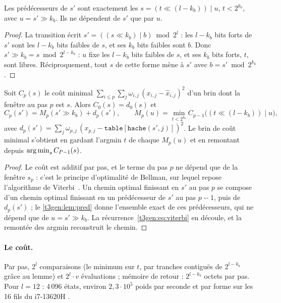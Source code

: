 \begin{lemme}\label{t3gen:lem:pred}
Les prédécesseurs de $s'$ sont exactement les $s = (t \ll (l - k_b)) \mid u$, $t < 2^{k_b}$, avec $u = s' \gg k_b$. Ils ne dépendent de $s'$ que par $u$.
\end{lemme}

\begin{proof}
La transition écrit $s' = ((s \ll k_b) \mid b) \bmod 2^l$ : les $l - k_b$ bits forts de $s'$ sont les $l - k_b$ bits faibles de $s$, et ses $k_b$ bits faibles sont $b$. Donc $s' \gg k_b = s \bmod 2^{l - k_b}$ : $u$ fixe les $l - k_b$ bits faibles de $s$, et ses $k_b$ bits forts, $t$, sont libres. Réciproquement, tout $s$ de cette forme mène à $s'$ avec $b = s' \bmod 2^{k_b}$.
\end{proof}

\begin{proposition}\label{t3gen:prop:viterbi}
Soit $C_p(s)$ le coût minimal $\sum_{i \le p}\sum_j \omega_{i,j}\,(x_{i,j} - \hat x_{i,j})^2$ d'un brin dont la fenêtre au pas $p$ est $s$. Alors $C_0(s) = d_0(s)$ et
\begin{equation}\label{t3gen:eq:viterbi}
C_p(s') = M_p(s' \gg k_b) + d_p(s'), \qquad M_p(u) = \min_{t < 2^{k_b}} C_{p-1}\bigl((t \ll (l - k_b)) \mid u\bigr),
\end{equation}
avec $d_p(s') = \sum_j \omega_{p,j}\,(x_{p,j} - \texttt{table}[\texttt{hache}(s', j)])^2$. Le brin de coût minimal s'obtient en gardant l'argmin $t$ de chaque $M_p(u)$ et en remontant depuis $\operatorname*{arg\,min}_s C_{P-1}(s)$.
\end{proposition}

\begin{proof}
Le coût est additif par pas, et le terme du pas $p$ ne dépend que de la fenêtre $s_p$ : c'est le principe d'optimalité de Bellman, sur lequel repose l'algorithme de Viterbi~\cite{viterbi1967}. Un chemin optimal finissant en $s'$ au pas $p$ se compose d'un chemin optimal finissant en un prédécesseur de $s'$ au pas $p-1$, puis de $d_p(s')$ ; le \cref{t3gen:lem:pred} donne l'ensemble exact de ces prédécesseurs, qui ne dépend que de $u = s' \gg k_b$. La récurrence~\eqref{t3gen:eq:viterbi} en découle, et la remontée des argmin reconstruit le chemin.
\end{proof}

\paragraph{Le coût.} Par pas, $2^l$ comparaisons (le minimum sur $t$, par tranches contiguës de $2^{l-k_b}$ grâce au lemme) et $2^l \cdot v$ évaluations ; mémoire de retour : $2^{l-k_b}$ octets par pas. Pour $l = 12$ : 4\,096 états, environ $2{,}3\cdot10^5$ poids par seconde et par forme sur les 16 fils du i7-13620H \mes.

